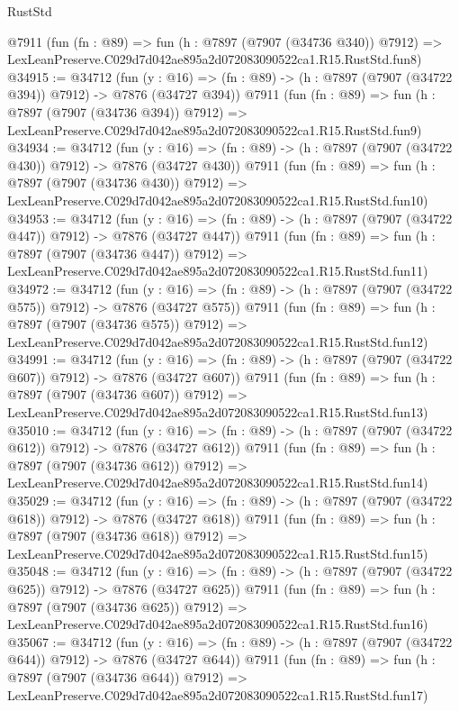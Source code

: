 \begin{lexlean}{RustStd}
\begin{coremodule}
    @7911
    (fun (fn : @89) =>
    fun (h : @7897 (@7907 (@34736 @340)) @7912) =>
    LexLeanPreserve.C029d7d042ae895a2d072083090522ca1.R15.RustStd.fun8)
@34915 := @34712
    (fun (y : @16) => (fn : @89) -> (h : @7897 (@7907 (@34722 @394)) @7912) -> @7876 (@34727 @394))
    @7911
    (fun (fn : @89) =>
    fun (h : @7897 (@7907 (@34736 @394)) @7912) =>
    LexLeanPreserve.C029d7d042ae895a2d072083090522ca1.R15.RustStd.fun9)
@34934 := @34712
    (fun (y : @16) => (fn : @89) -> (h : @7897 (@7907 (@34722 @430)) @7912) -> @7876 (@34727 @430))
    @7911
    (fun (fn : @89) =>
    fun (h : @7897 (@7907 (@34736 @430)) @7912) =>
    LexLeanPreserve.C029d7d042ae895a2d072083090522ca1.R15.RustStd.fun10)
@34953 := @34712
    (fun (y : @16) => (fn : @89) -> (h : @7897 (@7907 (@34722 @447)) @7912) -> @7876 (@34727 @447))
    @7911
    (fun (fn : @89) =>
    fun (h : @7897 (@7907 (@34736 @447)) @7912) =>
    LexLeanPreserve.C029d7d042ae895a2d072083090522ca1.R15.RustStd.fun11)
@34972 := @34712
    (fun (y : @16) => (fn : @89) -> (h : @7897 (@7907 (@34722 @575)) @7912) -> @7876 (@34727 @575))
    @7911
    (fun (fn : @89) =>
    fun (h : @7897 (@7907 (@34736 @575)) @7912) =>
    LexLeanPreserve.C029d7d042ae895a2d072083090522ca1.R15.RustStd.fun12)
@34991 := @34712
    (fun (y : @16) => (fn : @89) -> (h : @7897 (@7907 (@34722 @607)) @7912) -> @7876 (@34727 @607))
    @7911
    (fun (fn : @89) =>
    fun (h : @7897 (@7907 (@34736 @607)) @7912) =>
    LexLeanPreserve.C029d7d042ae895a2d072083090522ca1.R15.RustStd.fun13)
@35010 := @34712
    (fun (y : @16) => (fn : @89) -> (h : @7897 (@7907 (@34722 @612)) @7912) -> @7876 (@34727 @612))
    @7911
    (fun (fn : @89) =>
    fun (h : @7897 (@7907 (@34736 @612)) @7912) =>
    LexLeanPreserve.C029d7d042ae895a2d072083090522ca1.R15.RustStd.fun14)
@35029 := @34712
    (fun (y : @16) => (fn : @89) -> (h : @7897 (@7907 (@34722 @618)) @7912) -> @7876 (@34727 @618))
    @7911
    (fun (fn : @89) =>
    fun (h : @7897 (@7907 (@34736 @618)) @7912) =>
    LexLeanPreserve.C029d7d042ae895a2d072083090522ca1.R15.RustStd.fun15)
@35048 := @34712
    (fun (y : @16) => (fn : @89) -> (h : @7897 (@7907 (@34722 @625)) @7912) -> @7876 (@34727 @625))
    @7911
    (fun (fn : @89) =>
    fun (h : @7897 (@7907 (@34736 @625)) @7912) =>
    LexLeanPreserve.C029d7d042ae895a2d072083090522ca1.R15.RustStd.fun16)
@35067 := @34712
    (fun (y : @16) => (fn : @89) -> (h : @7897 (@7907 (@34722 @644)) @7912) -> @7876 (@34727 @644))
    @7911
    (fun (fn : @89) =>
    fun (h : @7897 (@7907 (@34736 @644)) @7912) =>
    LexLeanPreserve.C029d7d042ae895a2d072083090522ca1.R15.RustStd.fun17)

\end{coremodule}
\end{lexlean}
